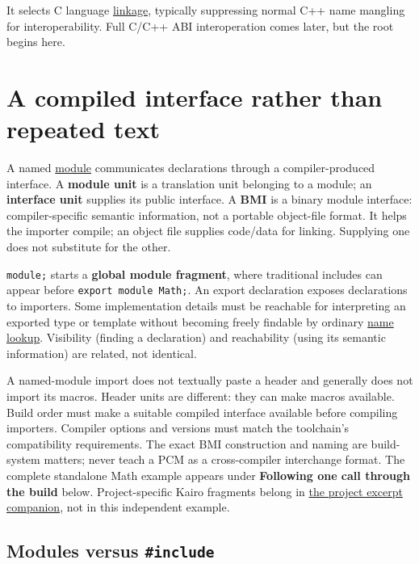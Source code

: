 It selects C language \hyperref[appendix-74a0ec818c18]{linkage}, typically suppressing normal C++ name mangling for interoperability. Full C/C++ ABI interoperation comes later, but the root begins here.

\section{A compiled interface rather than repeated text}\label{01-foundations-i-ch002-a-compiled-interface-rather-than-repeated-text}

A named \hyperref[appendix-410a611a5b8d]{module} communicates declarations through a compiler-produced interface. A \textbf{module unit} is a translation unit belonging to a module; an \textbf{interface unit} supplies its public interface. A \textbf{BMI} is a binary module interface: compiler-specific semantic information, not a portable object-file format. It helps the importer compile; an object file supplies code/data for linking. Supplying one does not substitute for the other.

\texttt{module;} starts a \textbf{global module fragment}, where traditional includes can appear before \texttt{export\ module\ Math;}. An export declaration exposes declarations to importers. Some implementation details must be reachable for interpreting an exported type or template without becoming freely findable by ordinary \hyperref[appendix-b12b31759da1]{name lookup}. Visibility (finding a declaration) and reachability (using its semantic information) are related, not identical.

A named-module import does not textually paste a header and generally does not import its macros. Header units are different: they can make macros available. Build order must make a suitable compiled interface available before compiling importers. Compiler options and versions must match the toolchain's compatibility requirements. The exact BMI construction and naming are build-system matters; never teach a PCM as a cross-compiler interchange format. The complete standalone Math example appears under \textbf{Following one call through the build} below. Project-specific Kairo fragments belong in \hyperref[appendix-4e2236f53445-source-reported-c-project-excerpts]{the project excerpt companion}, not in this independent example.

\subsection{\texorpdfstring{Modules versus \texttt{\#include}}{Modules versus \#include}}\label{01-foundations-i-ch002-modules-versus-include}

